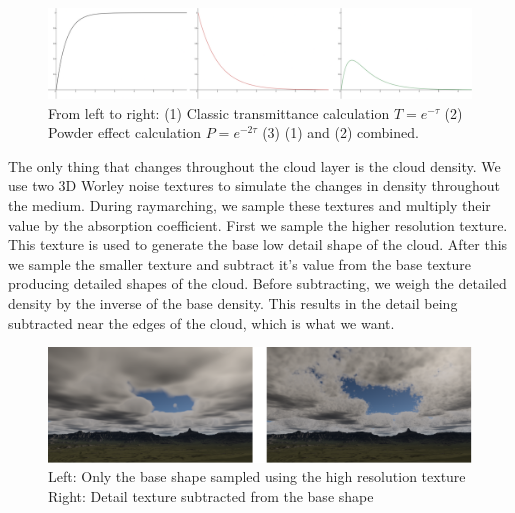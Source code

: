 \documentclass{ctuthesis}
\begin{document}
\begin{figure}
        \includegraphics[width=1.0\textwidth]{media/Powder_effect.png}
        \caption[Transmittance calculation curves]{From left to right: (1) Classic transmittance calculation $T = e^{-\tau}$ 
            (2) Powder effect calculation $P = e^{-2 \tau}$ (3) (1) and (2) combined.}
        \label{fig:Powder effect graph}
\end{figure}

The only thing that changes throughout the cloud layer is the cloud density. We use two 3D Worley noise 
textures to simulate the changes in density throughout the medium. During raymarching, we sample 
these textures and multiply their value by the absorption coefficient. First we sample
the higher resolution texture. This texture is used to generate the base low detail shape
of the cloud. After this we sample the smaller texture and subtract it's value from the base
texture producing detailed shapes of the cloud. Before subtracting, we weigh the detailed density
by the inverse of the base density. This results in the detail being subtracted near the edges of the cloud, which is what we want.

\begin{figure}
        \includegraphics[width=1.0\textwidth]{media/Cloud_baseshape_detailshape.png}
        \caption[Base vs detailed cloud shape]{Left: Only the base shape sampled using the high resolution texture 
                 Right: Detail texture subtracted from the base shape}
        \label{fig:Base shape vs detailed shape}
\end{figure}
\end{document}
